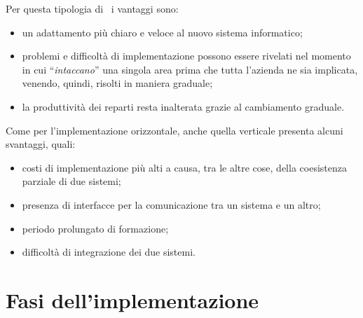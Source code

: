 	Per questa tipologia di \rollout~i vantaggi sono:
	\begin{itemize}[noitemsep]
		\renewcommand\labelitemi{--}
		\item un adattamento più chiaro e veloce al nuovo sistema informatico;
		\item problemi e difficoltà di implementazione possono essere rivelati nel momento in cui ``\textit{intaccano}'' una singola area prima che tutta l'azienda ne sia implicata, venendo, quindi, risolti in maniera graduale;
		\item la produttività dei reparti resta inalterata grazie al cambiamento graduale.
	\end{itemize}

	Come per l'implementazione orizzontale, anche quella verticale presenta alcuni svantaggi, quali:
	\begin{itemize}[noitemsep]
		\renewcommand\labelitemi{--}
		\item costi di implementazione più alti a causa, tra le altre cose, della coesistenza parziale di due sistemi;
		\item presenza di interfacce per la comunicazione tra un sistema e un altro;
		\item periodo prolungato di formazione;
		\item difficoltà di integrazione dei due sistemi.
	\end{itemize}

\section{Fasi dell'implementazione}

